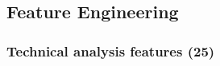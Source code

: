\documentclass[12pt,a4paper,oneside]{article}
\begin{document}
%
%
%
%


\subsection{Feature Engineering}\label{subsec:features}

%


\subsubsection{Technical analysis features (25)}\label{subsubsec:ta}
\end{document}
